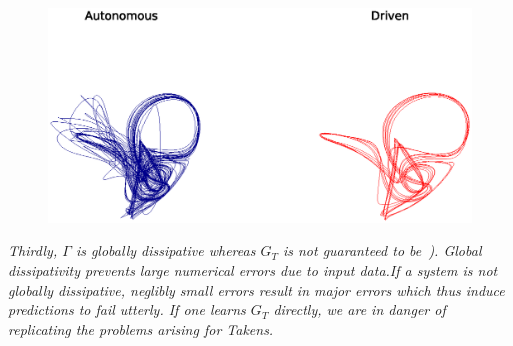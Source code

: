 \documentclass[a4paper,12pt,twoside]{report}
\newtheorem{Definition}{Definition}[]
\begin{document}

\begin{figure}[ht]
  \includegraphics[scale=0.5]{_AutovsDriven.eps}
  \centering
  \label{fig:learningFailure}
\end{figure}

\emph{Thirdly, $\Gamma$ is globally dissipative whereas $G_T$ is not guaranteed to be~\cite{manjunath2021universal}). 
Global dissipativity prevents large numerical errors due to input data.If a system is not globally dissipative, neglibly small errors result in major errors which thus induce predictions to fail utterly. If one learns $G_T$ directly, we are in danger of replicating the problems arising for Takens. }

\end{document}
